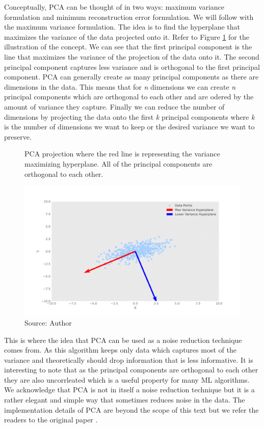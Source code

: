 Conceptually, \ac{PCA} can be thought of in two ways: maximum variance formulation
and minimum reconstruction error formulation. We will follow with the maximum variance formulation.
The idea is to find the hyperplane that maximizes the variance of the data projected onto it.
Refer to Figure \ref{fig:pca} for the illustration of the concept. We can see
that the first principal component is the line that maximizes the variance of the projection
of the data onto it. The second principal component captures
less variance and is orthogonal to the first principal component. \ac{PCA} can
generally create as many principal components as there are dimensions in the data.
This means that for \textit{n} dimensions we can create \textit{n} principal components which
are orthogonal to each other and are odered by the amount of variance they capture. 
Finally we can reduce the number of dimensions by projecting the data onto the first \textit{k} principal components
where \textit{k} is the number of dimensions we want to keep or the desired variance 
we want to preserve.

\begin{figure}[!h]
    \centering
    \caption{\ac{PCA} projection where the red line
    is representing the variance maximizing hyperplane. All of the 
    principal components are orthogonal to each other.}
    \includegraphics[width=1\textwidth]{Figures/pca_plot.png}
    \caption*{Source: Author}
    \label{fig:pca}
\end{figure}

This is where the idea that \ac{PCA} can be used as a noise reduction technique comes from.
As this algorithm keeps only data which captures most of the variance
and theoretically should drop information that is less informative.
It is interesting to note that as the principal components are orthogonal to each other 
they are also uncorrleated which is a useful property for many \ac{ML} algorithms. 
We acknowledge that \ac{PCA} is not in itself a noise reduction technique
but it is a rather elegant and simple way that sometimes reduces noise in the data.
The implementation details of \ac{PCA} are beyond the scope of this text but we refer the readers
to the original paper \citep{Pearson1901}.




